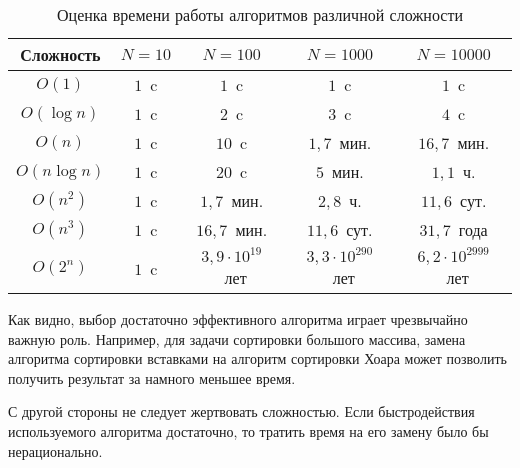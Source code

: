\begin{table}
  \begin{centering}
    \begin{tabular}{|c|c|c|c|c|}
      \hline 
      Сложность    & $N=10$ & $N=100$                 & $N=1000$                 & $N=10000$\\
      \hline 
      \hline 
      $O(1)$       & $1$~c  & $1$~c                   & $1$~c                    & $1$~c\\
      \hline 
      $O(\log n)$  & $1$~c  & $2$~c                   & $3$~c                    & $4$~c\\
      \hline 
      $O(n)$       & $1$~c  & $10$~c                  & $1{,}7$~мин.             & $16{,}7$~мин.\\
      \hline 
      $O(n\log n)$ & $1$~c  & $20$~c                  & $5$~мин.                 & $1{,}1$~ч.\\
      \hline 
      $O(n^{2})$   & $1$~c  & $1{,}7$~мин.            & $2{,}8$~ч.               & $11{,}6$~сут.\\
      \hline 
      $O(n^{3})$   & $1$~c  & $16{,}7$~мин.           & $11{,}6$~сут.            & $31{,}7$~года\\
      \hline 
      $O(2^{n})$   & $1$~c  & $3{,}9\cdot10^{19}$~лет & $3{,}3\cdot10^{290}$~лет & $6{,}2\cdot10^{2999}$~лет\\
      \hline 
    \end{tabular}
    \par
  \end{centering}
    
  \caption{Оценка времени работы алгоритмов различной сложности}
  \label{tbl:complexity}
\end{table}

Как видно, выбор достаточно эффективного алгоритма играет чрезвычайно
важную роль. Например, для задачи сортировки большого массива, замена
алгоритма сортировки вставками на алгоритм сортировки Хоара может
позволить получить результат за намного меньшее время.

С другой стороны не следует жертвовать сложностью. Если быстродействия
используемого алгоритма достаточно, то тратить время на его замену
было бы нерационально.
